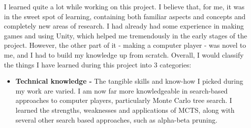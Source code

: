 I learned quite a lot while working on this project. I believe that, for me, it was in the sweet spot of learning, containing both familiar aspects and concepts and completely new areas of research. I had already had some experience in making games and using Unity, which helped me tremendously in the early stages of the project. However, the other part of it - making a computer player - was novel to me, and I had to build my knowledge up from scratch. Overall, I would classify the things I have learned during this project into 3 categories:
\begin{itemize}
\item \textbf{Technical knowledge - } The tangible skills and know-how I picked during my work are varied. I am now far more knowledgeable in search-based approaches to computer players, particularly Monte Carlo tree search. I learned the strengths, weaknesses and applications of MCTS, along with several other search based approaches, such as alpha-beta pruning.


\end{itemize}
